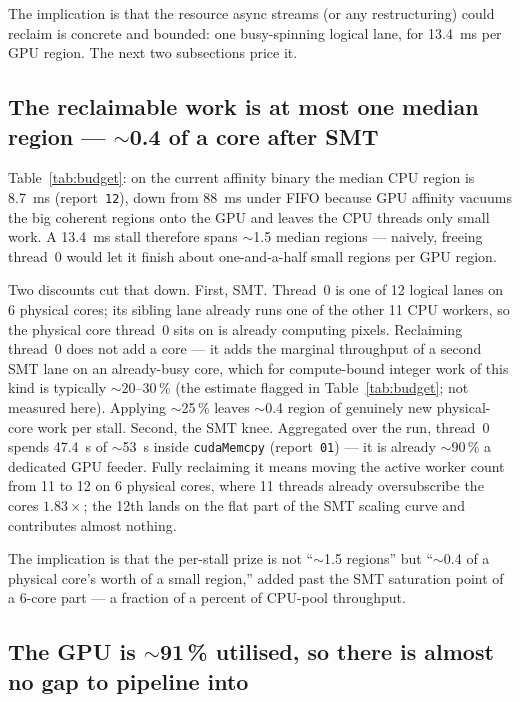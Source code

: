 \documentclass[
	english,
	letterpaper, oneside
]{article}
\begin{document}
The implication is that the resource async streams (or any restructuring) could
reclaim is concrete and bounded: one busy-spinning logical lane, for 13.4~ms per
GPU region. The next two subsections price it.

\subsection{The reclaimable work is at most one median region --- $\sim$0.4 of a core after SMT}\label{sec:budget}

Table~\ref{tab:budget}: on the current affinity binary the median CPU
region is 8.7~ms (report~\texttt{12}), down from 88~ms under FIFO because GPU
affinity vacuums the big coherent regions onto the GPU and leaves the CPU threads
only small work. A 13.4~ms stall therefore spans $\sim$1.5 median regions ---
naively, freeing thread~0 would let it finish about one-and-a-half small regions
per GPU region.

Two discounts cut that down. First, SMT. Thread~0 is one of 12 logical
lanes on 6 physical cores; its sibling lane already runs one of the other 11 CPU
workers, so the physical core thread~0 sits on is already computing
pixels. Reclaiming thread~0 does not add a core --- it adds the marginal
throughput of a second SMT lane on an already-busy core, which for compute-bound
integer work of this kind is typically $\sim$20--30\,\% (the estimate flagged in
Table~\ref{tab:budget}; not measured here). Applying $\sim$25\,\% leaves
$\sim$0.4 region of genuinely new physical-core work per stall. Second,
the SMT knee. Aggregated over the run, thread~0 spends 47.4~s of $\sim$53~s
inside \texttt{cudaMemcpy} (report~\texttt{01}) --- it is already $\sim$90\,\% a
dedicated GPU feeder. Fully reclaiming it means moving the active worker count
from 11 to 12 on 6 physical cores, where 11 threads already oversubscribe the
cores $1.83\times$; the 12th lands on the flat part of the SMT scaling curve and
contributes almost nothing.

The implication is that the per-stall prize is not ``$\sim$1.5 regions'' but
``$\sim$0.4 of a physical core's worth of a small region,'' added past the SMT
saturation point of a 6-core part --- a fraction of a percent of CPU-pool
throughput.

\subsection{The GPU is $\sim$91\,\% utilised, so there is almost no gap to pipeline into}
\end{document}
